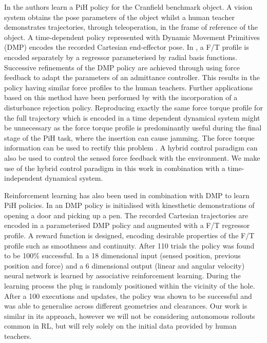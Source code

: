 In \cite{fast_peg_pbd_icmc_2014} the authors learn a PiH policy for the Cranfield benchmark object.
A vision system obtains the pose parameters of the object whilst a human teacher  
demonstrates trajectories, through teleoperation, in the frame of reference of the object. 
A time-dependent policy represented with Dynamic Movement Primitives (DMP) \citep{Schaal04learningmovement} 
encodes the recorded Cartesian end-effector pose. In \cite{trans_workpiece_icra_2013}, a F/T profile 
is encoded separately by a regressor parameterised by radial basis functions. Successive refinements of the DMP policy are achieved through 
using force feedback to adapt the parameters of an admittance controller. This results in the policy having
similar force profiles to the human teachers. Further applications based on this method have been 
performed by \cite{sol_pdg_pbd_2014} with the incorporation of a disturbance rejection policy. Reproducing exactly 
the same force torque profile for the full trajectory which is encoded in a time dependent dynamical system might be unnecessary as the force torque profile is 
predominantly useful during the final stage of the PiH task, where the insertion can cause jamming. 
The force torque information can be used to rectify this problem \cite[Chap. 5]{Kronander2015}. A 
hybrid control paradigm \citep{hybrid_1992} can also be used to control the sensed force feedback with the environment.
We make use of the hybrid control paradigm in this work in combination with a time-independent dynamical system.

Reinforcement learning has also been used in combination with DMP to learn PiH policies. In \cite{learn_force_c_icirs_2011}
an DMP policy is initialised with kinesthetic demonstrations of opening a door and picking up a pen. The recorded Cartesian 
trajectories are encoded in a parameterised DMP policy and augmented with a F/T regressor profile. A reward function is designed, 
encoding desirable properties of the F/T profile such as smoothness and continuity. After 110 trials the policy
was found to be 100\% successful. In \cite{learn_admittance_icra_1994} a 18 dimensional input (sensed position, previous position and force) 
and a 6 dimensional output (linear and angular velocity) neural network is learned by associative reinforcement learning. 
During the learning process the plug is randomly positioned within the vicinity of the hole. After a 100 executions and 
updates, the policy was shown to be successful and was able to generalise across different geometries and clearances.
Our work is similar in its approach, however we will not be considering autonomous rollouts common 
in RL, but will rely solely on the initial data provided by human teachers.


